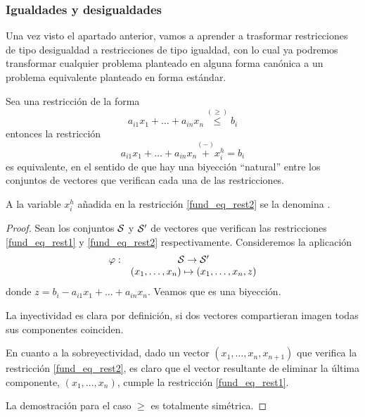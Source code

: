 \subsubsection{Igualdades y desigualdades}
Una vez visto el apartado anterior, vamos a aprender a trasformar restricciones de tipo desigualdad a restricciones de tipo igualdad, con lo cual ya podremos transformar cualquier problema planteado en alguna forma canónica a un problema equivalente planteado en forma estándar.
\begin{lem}
	Sea una restricción de la forma
	\begin{equation}
	\label{fund_eq_rest1}
		a_{i1}x_1+\dots+a_{in}x_n\stackrel{(\geq)}{\leq} b_i
	\end{equation}
	entonces la restricción
	\begin{equation}
	\label{fund_eq_rest2}
		a_{i1}x_1+\dots+a_{in}x_n\stackrel{(-)}{+}x_i^h=b_i
	\end{equation}
	es equivalente, en el sentido de que hay una biyección ``natural'' entre los conjuntos de vectores  que verifican cada una de las restricciones.
	
	A la variable $x_i^h$ añadida en la restricción \eqref{fund_eq_rest2} se la denomina .
\end{lem}
\begin{proof}
	Sean los conjuntos $\mathcal{S}$ y $\mathcal{S}'$ de vectores que verifican las restricciones \eqref{fund_eq_rest1} y \eqref{fund_eq_rest2} respectivamente. Consideremos la aplicación
	\begin{equation*}
		\begin{array}{cc}
		\varphi:&\mathcal{S}\to\mathcal{S}'\\
		& (x_1,\dots,x_n)\mapsto (x_1,\dots,x_n,z)
		\end{array}
	\end{equation*}
	donde $z=b_i-a_{i1}x_1+\dots+a_{in}x_n$. Veamos que es una biyección.
	
	La inyectividad es clara por definición, si dos vectores compartieran imagen todas sus componentes coinciden.
	
	En cuanto a la sobreyectividad, dado un vector $(x_1,\dots,x_n,x_{n+1})$ que verifica la restricción \eqref{fund_eq_rest2}, es claro que el vector resultante de eliminar la última componente, $(x_1,\dots,x_n)$, cumple la restricción \eqref{fund_eq_rest1}.
	
	La demostración para el caso $\geq$ es totalmente simétrica.
\end{proof}
